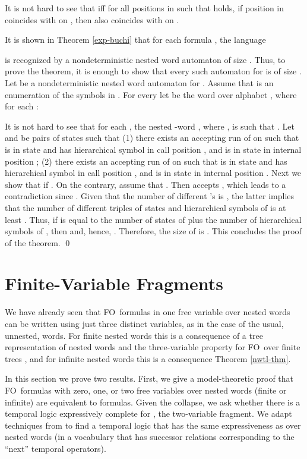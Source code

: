 \documentclass{LMCS}
\newcommand{\FO}{{\rm FO}}
\theoremstyle{plain}
\theoremstyle{definition}
\begin{document}
It is not hard to see that  iff for all positions
 in  such that  holds, if position  in
 coincides with  on , then  also
coincides with  on .

It is shown in Theorem \ref{exp-buchi} that for each 
formula , the language 

is recognized by a nondeterministic nested word automaton of size
. Thus, to prove the theorem, it is enough to show
that every such automaton for  is of size
.  Let  be a nondeterministic nested word
automaton for .  Assume that  is
an enumeration of the symbols in . For every  let  be the word  over
alphabet , where for each :

It is not hard to see that for each ,
the nested -word , where , is such that
. Let  and
 be pairs of states such that (1) there
exists an accepting run of  on  such that  is
in state  and has hierarchical symbol  in call position
, and  is in state  in internal position ;
(2) there exists an accepting run of  on  such
that  is in state  and has hierarchical symbol 
in call position , and  is in state  in internal
position . Next we show that  if . On the contrary, assume
that . Then  accepts
, which leads to a contradiction since . Given that the number
of different 's is , the latter implies that the number of
different triples of states and hierarchical symbols of  is at
least . Thus, if  is equal to the number of states of 
plus the number of hierarchical symbols of , then  and, hence, . Therefore, the size of 
is . This concludes the proof of the theorem.
\qed




\section{Finite-Variable Fragments}
\label{fv-sec}

\noindent We have already seen that \FO\ formulas in one free variable over
nested words can be written using just three distinct variables, as in
the case of the usual, unnested, words. For finite nested words this
is a consequence of a tree representation of nested words and the
three-variable property for \FO\ over finite trees \cite{marx-tods},
and for infinite nested words this is a consequence Theorem
\ref{nwtl-thm}. 

In this section we prove two results. First, we give a model-theoretic
proof that \FO\ formulas with zero, one, or two free variables over
nested words (finite or infinite) are equivalent to  formulas.
Given the  collapse, we ask whether there is
a temporal logic expressively complete for , the two-variable
fragment. We adapt techniques from \cite{EVW02}
to find a temporal logic that has the same expressiveness as 
over nested words (in a vocabulary that has successor relations
corresponding to the ``next'' temporal operators).
\end{document}
